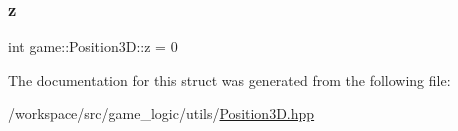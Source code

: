 \mbox{\label{structgame_1_1_position3_d_a51b84044e3c272d06985b3dc5a9f07e7}} 
\subsubsection{\texorpdfstring{z}{z}}
{\footnotesize\ttfamily int game\+::\+Position3\+D\+::z = 0}



The documentation for this struct was generated from the following file\+:\begin{DoxyCompactItemize}
\item 
/workspace/src/game\+\_\+logic/utils/\hyperlink{_position3_d_8hpp}{Position3\+D.\+hpp}\end{DoxyCompactItemize}
